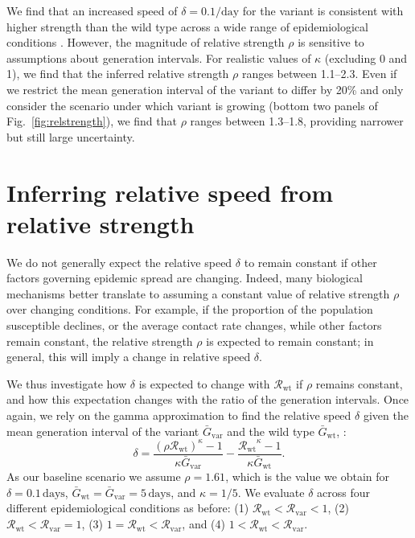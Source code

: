 \documentclass[12pt]{article}
\newcommand{\fref}[1]{Fig.~\ref{fig:#1}}
\newcommand{\vvvar}{\mathrm{var}}
\newcommand{\wwwt}{\mathrm{wt}}
\newcommand{\Rx}[1]{\ensuremath{{\mathcal R}_{#1}}\xspace}
\newcommand{\Rw}{\Rx{\wwwt}}
\newcommand{\Rv}{\Rx{\vvvar}}
\newcommand{\pday}{\ensuremath{/\textrm{day}}}
\newcommand{\Gx}[1]{\ensuremath{{\bar G}_{#1}}\xspace}
\newcommand{\Gw}{\Gx{\wwwt}}
\newcommand{\Gv}{\Gx{\vvvar}}
\begin{document}
We find that an increased speed of $\delta=0.1\pday$ for the variant is consistent with higher strength than the wild type across a wide range of epidemiological conditions \citep{switzerland2021variant, davies2021estimated, di2021impact, leung2021early, volz2021transmission,zhao2021}.
However, the magnitude of relative strength $\rho$ is sensitive to assumptions about generation intervals.
For realistic values of $\kappa$ (excluding 0 and 1), we find that the inferred relative strength $\rho$ ranges between 1.1--2.3.
Even if we restrict the mean generation interval of the variant to differ by 20\% and only consider the scenario under which variant is growing (bottom two panels of \fref{relstrength}), we find that $\rho$ ranges between 1.3--1.8, providing narrower but still large uncertainty.

\section{Inferring relative speed from relative strength}

We do not generally expect the relative speed $\delta$ to remain constant if other factors governing epidemic spread are changing.
Indeed, many biological mechanisms better translate to assuming a constant value of relative strength $\rho$ over changing conditions.
For example, if the proportion of the population susceptible declines, or the average contact rate changes, while other factors remain constant, the relative strength $\rho$ is expected to remain constant; 
in general, this will imply a change in relative speed $\delta$.

We thus investigate how $\delta$ is expected to change with \Rw if $\rho$ remains constant, and how this expectation changes with the ratio of the generation intervals. 
Once again, we rely on the gamma approximation to find the relative speed $\delta$ given the mean generation interval of the variant $\Gv$ and the wild type $\Gw$, :
\begin{equation}
\delta = \frac{(\rho \Rw)^{\kappa} - 1}{\kappa \Gv} - \frac{\Rw^{\kappa} - 1}{\kappa \Gw}.
\end{equation}
As our baseline scenario we assume $\rho = 1.61$, which is the value we obtain for $\delta=0.1\,\textrm{days}$, $\Gw = \Gv = 5\,\textrm{days}$, and $\kappa = 1/5$.
We evaluate $\delta$ across four different epidemiological conditions as before: (1) $\Rw < \Rv < 1$, (2) $\Rw < \Rv = 1$, (3) $1 = \Rw < \Rv$, and (4) $1 < \Rw < \Rv$.
\end{document}
